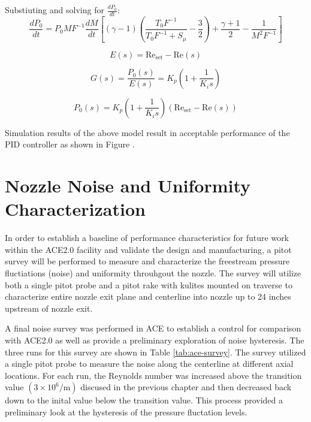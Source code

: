 Substiuting and solving for $\frac{dP_0}{dt}$:
\begin{equation}
    \frac{dP_0}{dt} = P_0 M F^{-1} \frac{dM}{dt} \left[ (\gamma-1) \left( \frac{T_0 F^{-1}}{T_0 F^{-1} + S_\mu} - \frac{3}{2} \right) + \frac{\gamma+1}{2} - \frac{1}{M^2 F^{-1}} \right]
\end{equation}

\begin{equation}
    E(s) = \mathrm{Re_{set}} - \mathrm{Re}(s)
\end{equation}

\begin{equation}
    G(s) = \frac{P_0(s)}{E(s)} = K_p \left(1 + \frac{1}{K_i s}\right)
\end{equation}

\begin{equation}
    P_0(s) = K_p \left(1 + \frac{1}{K_i s}\right) \left(\mathrm{Re_{set}} - \mathrm{Re}(s)\right)
\end{equation}

Simulation results of the above model result in acceptable performance of the PID controller as shown in Figure .

\section{Nozzle Noise and Uniformity Characterization}

In order to establish a baseline of performance characteristics for future work within the ACE2.0 facility and validate the design and manufacturing, a pitot survey will be performed to measure and characterize the freestream pressure fluctiations (noise) and uniformity throuhgout the nozzle. The survey will utilize both a single pitot probe and a pitot rake with kulites mounted on traverse to characterize entire nozzle exit plane and centerline into nozzle up to 24 inches upstream of nozzle exit.

A final noise survey was performed in ACE to establish a control for comparison with ACE2.0 as well as provide a preliminary exploration of noise hysteresis. The three runs for this survey are shown in Table \ref{tab:ace-survey}. The survey utilized a single pitot probe to measure the noise along the centerline at different axial locations. For each run, the Reynolds number was increased above the transition value $\left(3 \times 10^6/\mathrm{m}\right)$ discused in the previous chapter and then decreased back down to the inital value below the transition value. This process provided a preliminary look at the hysteresis of the pressure fluctation levels.


